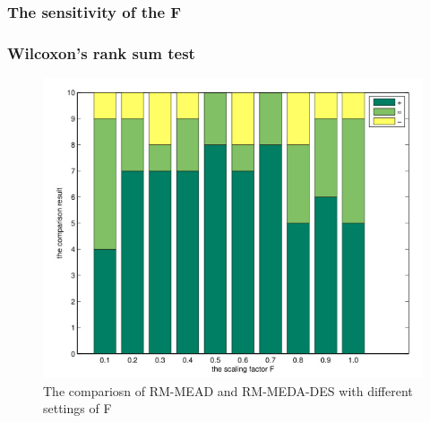 \documentclass[xcolor=dvipsnames]{beamer}
\begin{document}
    \begin{frame}
    \frametitle{The sensitivity of the F}
    \begin{figure}[htbp]
    \centering
    \end{figure}
    \end{frame}

    \begin{frame}
    \frametitle{Wilcoxon's rank sum test}
    \begin{figure}
    \centering
    \includegraphics[width=0.6\columnwidth]{f_performance.jpg}
    \caption{The compariosn of RM-MEAD and RM-MEDA-DES with different settings of F}
    \end{figure}
    \end{frame}
\end{document}
